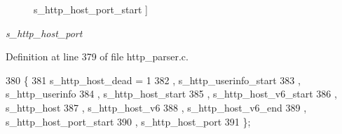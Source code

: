 \begin{Desc}
\begin{description}
{s\+\_\+http\+\_\+host\+\_\+port\+\_\+start\label{http__parser_8c_ae8df1d915c4ab1e80985eb2611ccbdc9a273640cc7fac87e86226f20c6bf51084}
}]\item[{\em 
s\+\_\+http\+\_\+host\+\_\+port\label{http__parser_8c_ae8df1d915c4ab1e80985eb2611ccbdc9a6d116c6cd5b2c0d08b75b5ca772d1f87}
}]\end{description}
\end{Desc}


Definition at line 379 of file http\+\_\+parser.\+c.


\begin{DoxyCode}
380   \{
381     s_http_host_dead = 1
382   , s_http_userinfo_start
383   , s_http_userinfo
384   , s_http_host_start
385   , s_http_host_v6_start
386   , s_http_host
387   , s_http_host_v6
388   , s_http_host_v6_end
389   , s_http_host_port_start
390   , s_http_host_port
391 \};
\end{DoxyCode}
